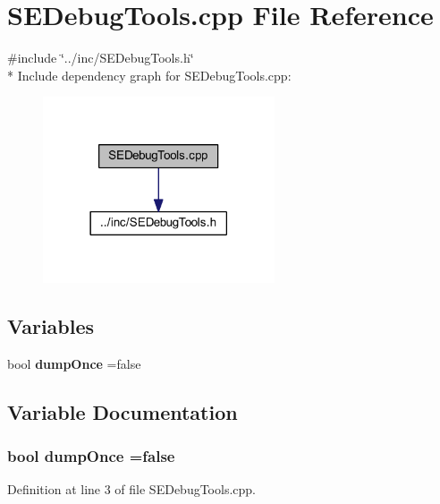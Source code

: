 \section{S\+E\+Debug\+Tools.\+cpp File Reference}
\label{_s_e_debug_tools_8cpp}
{\ttfamily \#include \char`\"{}../inc/\+S\+E\+Debug\+Tools.\+h\char`\"{}}\\*
Include dependency graph for S\+E\+Debug\+Tools.\+cpp\+:
\nopagebreak
\begin{figure}[H]
\begin{center}
\leavevmode
\includegraphics[width=194pt]{_s_e_debug_tools_8cpp__incl}
\end{center}
\end{figure}
\subsection*{Variables}
\begin{DoxyCompactItemize}
\item 
bool {\bf dump\+Once} =false
\end{DoxyCompactItemize}


\subsection{Variable Documentation}
\subsubsection[{dump\+Once}]{\setlength{\rightskip}{0pt plus 5cm}bool dump\+Once =false}\label{_s_e_debug_tools_8cpp_a93bb783026d9b08a34de5cc10ae2145d}


Definition at line 3 of file S\+E\+Debug\+Tools.\+cpp.

